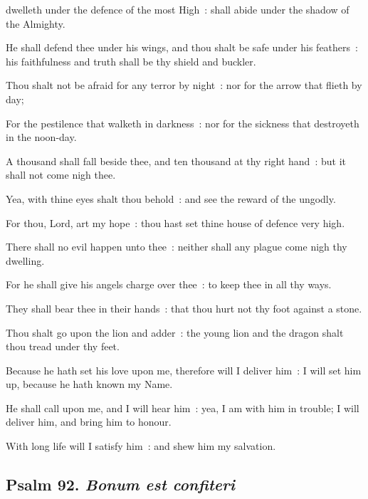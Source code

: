  dwelleth under the defence of the most High~: shall abide under the shadow of the Almighty.\par
{}
He shall defend thee under his wings, and thou shalt be safe under his feathers~: his faithfulness and truth shall be thy shield and buckler.\par
{}Thou shalt not be afraid for any terror by night~: nor for the arrow that flieth by day;\par
{}For the pestilence that walketh in darkness~: nor for the sickness that destroyeth in the noon-day.\par
{}A thousand shall fall beside thee, and ten thousand at thy right hand~: but it shall not come nigh thee.\par
{}Yea, with thine eyes shalt thou behold~: and see the reward of the ungodly.\par
{}For thou, Lord, art my hope~: thou hast set thine house of defence very high.\par
{}There shall no evil happen unto thee~: neither shall any plague come nigh thy dwelling.\par
{}For he shall give his angels charge over thee~: to keep thee in all thy ways.\par
{}They shall bear thee in their hands~: that thou hurt not thy foot against a stone.\par
{}Thou shalt go upon the lion and adder~: the young lion and the dragon shalt thou tread under thy feet.\par
{}Because he hath set his love upon me, therefore will I deliver him~: I will set him up, because he hath known my Name.\par
{}He shall call upon me, and I will hear him~: yea, I am with him in trouble; I will deliver him, and bring him to honour.\par
{}With long life will I satisfy him~: and shew him my salvation.\par


\clearpage
\subsection{Psalm 92. \textit{Bonum est confiteri}}

